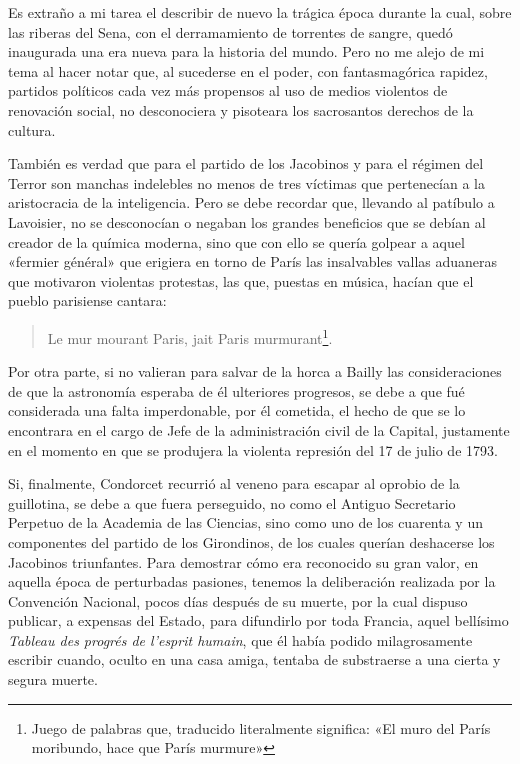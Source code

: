 \documentclass[a4paper, 12pt, draft]{article}
\begin{document}
{{Es extraño a mi tarea el describir de nuevo la trágica época durante la cual, sobre las riberas del Sena, con el derramamiento de torrentes de sangre, quedó inaugurada una era nueva para la historia del mundo. Pero no me alejo de mi tema al hacer notar que, al sucederse en el poder, con fantasmagórica rapidez, partidos políticos cada vez más propensos al uso de medios violentos de renovación social, no desconociera y pisoteara los sacrosantos derechos de la cultura.

También es verdad que para el partido de los Jacobinos y para el régimen del Terror son manchas indelebles no menos de tres víctimas que pertenecían a la aristocracia de la inteligencia. Pero se debe recordar que, llevando al patíbulo a Lavoisier, no se desconocían o negaban los grandes beneficios que se debían al creador de la química moderna, sino que con ello se quería golpear a aquel «fermier général» que erigiera en torno de París las insalvables vallas aduaneras que motivaron violentas protestas, las que, puestas en música, hacían que el pueblo parisiense cantara:

\begin{verse}\it

Le mur mourant Paris, jait Paris murmurant\footnote{Juego de palabras que, traducido literalmente significa: «El muro del París moribundo, hace que París murmure»}.

\end{verse}

Por otra parte, si no valieran para salvar de la horca a Bailly las consideraciones de que la astronomía esperaba de él ulteriores progresos, se debe a que fué considerada una falta imperdonable, por él cometida, el hecho de que se lo encontrara en el cargo de Jefe de la administración civil de la Capital, justamente en el momento en que se produjera la violenta represión del 17 de julio de 1793.

Si, finalmente, Condorcet recurrió al veneno para escapar al oprobio de la guillotina, se debe a que fuera perseguido, no como el Antiguo Secretario Perpetuo de la Academia de las Ciencias, sino como uno de los cuarenta y un componentes del partido de los Girondinos, de los cuales querían deshacerse los Jacobinos triunfantes. Para demostrar cómo era reconocido su gran valor, en aquella época de perturbadas pasiones, tenemos la deliberación realizada por la Convención Nacional, pocos días después de su muerte, por la cual dispuso publicar, a expensas del Estado, para difundirlo por toda Francia, aquel bellísimo \textit{ Tableau des progrés de l'esprit humain}, que él había podido milagrosamente escribir cuando, oculto en una casa amiga, tentaba de substraerse a una cierta y segura muerte.

}}
\end{document}
